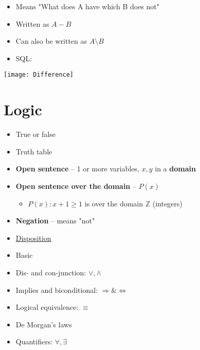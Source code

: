 \documentclass[english,10pt,a4paper]{article}
\begin{document}
\begin{theo}[Difference] 
\begin{minipage}{0.7\linewidth}
\begin{itemize}
\item Means "What does A have which B does not"
\item Written as $A - B$ 
\item Can also be written as $A \setminus B $
\item SQL: \\
\end{itemize}
\end{minipage}
\hspace{0.25cm}
\begin{minipage}{0.25\linewidth}
\texttt{[image: Difference]}
\end{minipage}

\end{theo}



\newpage
\section{Logic}
\begin{minipage}[t]{0.65\linewidth}
\begin{theo}[Basic] 
\begin{itemize}
\item True or false
\item Truth table
\item \textbf{Open sentence} -- 1 or more variables, $x,y$ in a \textbf{domain}
\item \textbf{Open sentence over the domain} -- $P(x)$
\begin{itemize}
\item $P(x): x+1 \geq 1$ is over the domain $\mathbb{Z}$ (integers)
\end{itemize}
\item \textbf{Negation} -- means "not"
\end{itemize}
\end{theo}
\end{minipage}
\hspace{0.10cm}
\begin{minipage}[t]{0.3\linewidth}
\begin{itemize}
\item[] \underline{Disposition}
\item Basic
\item Dis- and con-junction: $\vee, \wedge$
\item Implies and biconditional: $\Rightarrow \& \Leftrightarrow$
\item Logical equivalence: $\equiv$
\item De Morgan's laws
\item Quantifiers: $\forall, \exists$
\end{itemize}
\end{minipage}
\end{document}
